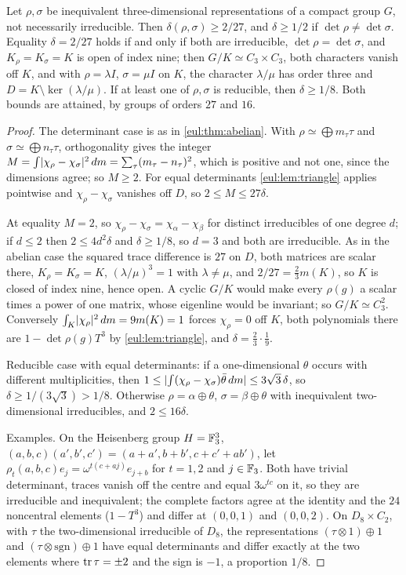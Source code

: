 \begin{theorem}\label{eul:thm:cubic}
Let $\rho,\sigma$ be inequivalent three-dimensional representations of a compact group $G$, not necessarily
irreducible. Then $\delta(\rho,\sigma)\ge2/27$, and $\delta\ge1/2$ if $\det\rho\ne\det\sigma$. Equality
$\delta=2/27$ holds if and only if both are irreducible, $\det\rho=\det\sigma$, and $K_\rho=K_\sigma=K$ is open of
index nine; then $G/K\simeq C_3\times C_3$, both characters vanish off $K$, and with $\rho=\lambda I$, $\sigma=\mu I$ on
$K$, the character $\lambda/\mu$ has order three and $D=K\setminus\ker(\lambda/\mu)$. If at least one of $\rho,\sigma$
is reducible, then $\delta\ge1/8$. Both bounds are attained, by groups of orders $27$ and $16$.
\end{theorem}

\begin{proof}
The determinant case is as in \cref{eul:thm:abelian}. With $\rho\simeq\bigoplus m_\tau\tau$ and
$\sigma\simeq\bigoplus n_\tau\tau$, orthogonality gives the integer $M=\int\lvert\chi_\rho-\chi_\sigma\rvert^2\,dm=\sum_\tau(m_\tau-n_\tau)^2$,
which is positive and not one, since the dimensions agree; so $M\ge2$. For equal determinants
\cref{eul:lem:triangle} applies pointwise and $\chi_\rho-\chi_\sigma$ vanishes off $D$, so $2\le M\le27\delta$.

At equality $M=2$, so $\chi_\rho-\chi_\sigma=\chi_\alpha-\chi_\beta$ for distinct irreducibles of one degree $d$; if
$d\le2$ then $2\le4d^2\delta$ and $\delta\ge1/8$, so $d=3$ and both are irreducible. As in the abelian case the squared
trace difference is $27$ on $D$, both matrices are scalar there, $K_\rho=K_\sigma=K$, $(\lambda/\mu)^3=1$ with
$\lambda\ne\mu$, and $2/27=\frac23m(K)$, so $K$ is closed of index nine, hence open. A cyclic $G/K$ would make every
$\rho(g)$ a scalar times a power of one matrix, whose eigenline would be invariant; so $G/K\simeq C_3^2$. Conversely
$\int_K\lvert\chi_\rho\rvert^2\,dm=9m(K)=1$ forces $\chi_\rho=0$ off $K$, both polynomials there are $1-\det\rho(g)T^3$ by
\cref{eul:lem:triangle}, and $\delta=\frac23\cdot\frac19$.

Reducible case with equal determinants: if a one-dimensional $\theta$ occurs with different multiplicities, then
$1\le\lvert\int(\chi_\rho-\chi_\sigma)\bar\theta\,dm\rvert\le3\sqrt3\,\delta$, so $\delta\ge1/(3\sqrt3)>1/8$. Otherwise
$\rho=\alpha\oplus\theta$, $\sigma=\beta\oplus\theta$ with inequivalent two-dimensional irreducibles, and
$2\le16\delta$.

Examples. On the Heisenberg group $H=\mathbb{F}_3^3$, $(a,b,c)(a',b',c')=(a+a',b+b',c+c'+ab')$, let
$\rho_t(a,b,c)e_j=\omega^{t(c+aj)}e_{j+b}$ for $t=1,2$ and $j\in\mathbb{F}_3$. Both have trivial determinant, traces vanish
off the centre and equal $3\omega^{tc}$ on it, so they are irreducible and inequivalent; the complete factors agree
at the identity and the $24$ noncentral elements ($1-T^3$) and differ at $(0,0,1)$ and $(0,0,2)$. On
$D_8\times C_2$, with $\tau$ the two-dimensional irreducible of $D_8$, the representations
$(\tau\otimes1)\oplus1$ and $(\tau\otimes\mathrm{sgn})\oplus1$ have equal determinants and differ exactly at the two
elements where $\operatorname{tr}\tau=\pm2$ and the sign is $-1$, a proportion $1/8$.
\end{proof}

